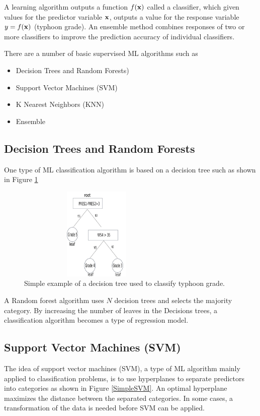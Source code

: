 \documentclass{SBCbookchapter}
\begin{document}
	
	A learning algorithm outputs a function $f({\bf x})$ called a classifier, which given values for the predictor variable ${\bf x}$, outputs a value for the response variable $y=f({\bf x})$ (typhoon grade).  An ensemble method combines responses of two or more classifiers to improve the prediction accuracy of individual classifiers. 
	
	There are a number of basic supervised ML algorithms \cite{Bon} such as
	
	\begin{itemize}
		\item Decision Trees and Random Forests)
		\item Support Vector Machines (SVM)
		\item K Nearest Neighbors (KNN)
		\item Ensemble
	\end{itemize}
	
	\subsection{Decision Trees and Random Forests}
	
	One type of ML classification algorithm is based on a decision tree such as shown in Figure \ref{SimpleDecTree}  
	
	\begin{figure}[!htpb]
		\centering
		\includegraphics[width=3in,height=1.75in]{SimpleDecTree.png}
		\caption{Simple example of a decision tree used to classify typhoon grade.}
		\label{SimpleDecTree}
	\end{figure}
	
	A Random forest algorithm uses $N$ decision trees and selects the majority category. By increasing the number of leaves in the Decisions trees, a classification algorithm becomes a type of regression model.
	
	\subsection{Support Vector Machines (SVM)}
	The idea of support vector machines (SVM), a type of ML algorithm mainly applied to classification problems,  is to use hyperplanes to separate predictors into categories as shown in Figure \ref{SimpleSVM}. An optimal hyperplane maximizes the distance between the separated categories. In some cases, a transformation of the data is needed before SVM can be applied. 
	
\end{document}
